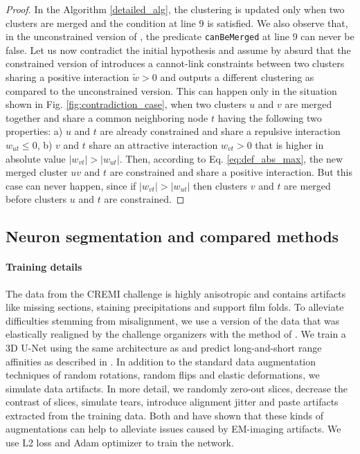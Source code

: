 \begin{proof}
In the \algname{} Algorithm \ref{detailed_alg}, the clustering is updated only when two clusters are merged and the condition at line 9 is satisfied. 
We also observe that, in the unconstrained version of \algname{}, the predicate \texttt{canBeMerged} at line 9 can never be false.
Let us now contradict the initial hypothesis and assume by absurd that the constrained version of \algname{} introduces a cannot-link constraints between two clusters sharing a positive interaction $\tilde{w}>0$ and outputs a different clustering as compared to the unconstrained version. 
This can happen only in the situation shown in Fig. \ref{fig:contradiction_case}, when two clusters $u$ and $v$ are merged together and share a common neighboring node $t$ having the following two properties: a) $u$ and $t$ are already constrained and share a repulsive interaction $w_{ut}\leq0$, b) $v$ and $t$ share an attractive interaction $w_{vt}>0$ that is higher in absolute value $|w_{vt}|>|w_{ut}|$. 
Then, according to Eq. \ref{eq:def_abs_max}, the new merged cluster $uv$ and $t$ are constrained and share a positive interaction. 
But this case can never happen, since if $|w_{vt}|>|w_{ut}|$ then clusters $v$ and $t$ are merged before clusters $u$ and $t$ are constrained.  
\end{proof}

\subsection{Neuron segmentation and compared methods}\label{sec:cremi_details}
\paragraph{Training details} The data from the CREMI challenge is highly anisotropic and contains artifacts like missing sections, staining precipitations and support film folds. 
To alleviate difficulties stemming from misalignment, we use a version of the data that was elastically realigned by the challenge organizers with the method of \cite{saalfeld2012elastic}.
We train a 3D U-Net \cite{ronneberger2015u, cciccek20163d} using the same architecture as \cite{funke2018large} and predict long-and-short range affinities 
as described in \cite{lee2017superhuman}. In addition to the standard data augmentation techniques of random rotations, random flips and  elastic deformations, we simulate data artifacts.
In more detail, we randomly zero-out slices, decrease the contrast of slices, simulate tears, introduce alignment jitter and paste artifacts extracted from the training data. Both \cite{funke2018large} and \cite{lee2017superhuman} have shown
that these kinds of augmentations can help to alleviate issues caused by EM-imaging artifacts.
We use L2 loss and Adam optimizer to train the network. 


